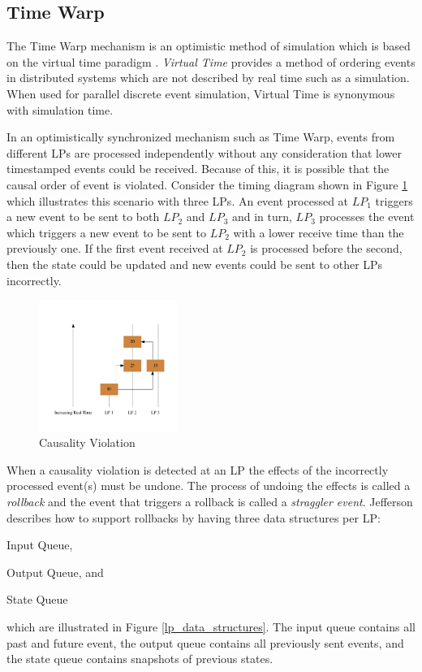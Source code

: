 \documentclass[11pt]{book}
\begin{document}
\subsection{Time Warp}

The Time Warp mechanism is an optimistic method of simulation which is based on the virtual time
paradigm \cite{jefferson-85}.  \emph{Virtual Time} provides a method of ordering events in
distributed systems which are not described by real time such as a simulation.  When used for
parallel discrete event simulation, Virtual Time is synonymous with simulation time.

In an optimistically synchronized mechanism such as Time Warp, events from different LPs are
processed independently without any consideration that lower timestamped events could be received.
Because of this, it is possible that the causal order of event is violated.  Consider the timing
diagram shown in Figure \ref{causality_violation} which illustrates this scenario with three LPs. An
event processed at $LP_1$ triggers a new event to be sent to both $LP_2$ and $LP_3$ and in turn,
$LP_3$ processes the event which triggers a new event to be sent to $LP_2$ with a lower receive time
than the previously one. If the first event received at $LP_2$ is processed before the second, then
the state could be updated and new events could be sent to other LPs incorrectly.

\begin{figure}
    \centering
    \includegraphics[width=0.4\textwidth,quiet]{figs/graphviz/causality.pdf}
    \caption{Causality Violation}\label{causality_violation}
\end{figure}

When a causality violation is detected at an LP the effects of the incorrectly processed event(s)
must be undone. The process of undoing the effects is called a \emph{rollback} and the event that
triggers a rollback is called a \emph{straggler event}. Jefferson \cite{jefferson-85} describes how
to support rollbacks by having three data structures per LP:
\begin{inparaenum}[(1)] \item Input Queue, \item Output Queue, and \item State Queue
\end{inparaenum} which are illustrated in Figure \ref{lp_data_structures}. The input queue
contains all past and future event, the output queue contains all previously sent events, and
the state queue contains snapshots of previous states.
\end{document}

